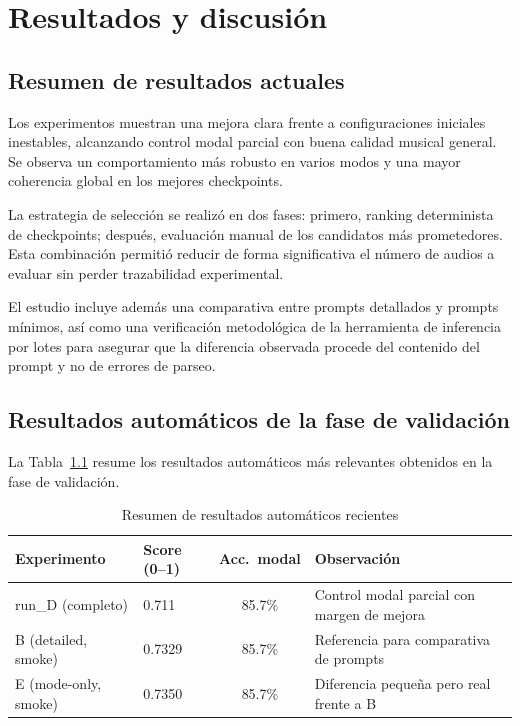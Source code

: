 \documentclass[%
    school=etsisi,%
    type=pfg,%
    degree=61CD,%
]{upm-report}
\begin{document}
\chapter{Resultados y discusi\'on}
\label{ch:resultados}

\section{Resumen de resultados actuales}

Los experimentos muestran una mejora clara frente a configuraciones iniciales inestables, alcanzando control modal parcial con buena calidad musical general. Se observa un comportamiento m\'as robusto en varios modos y una mayor coherencia global en los mejores checkpoints.

La estrategia de selecci\'on se realiz\'o en dos fases: primero, ranking determinista de checkpoints; despu\'es, evaluaci\'on manual de los candidatos m\'as prometedores. Esta combinaci\'on permiti\'o reducir de forma significativa el n\'umero de audios a evaluar sin perder trazabilidad experimental.

El estudio incluye adem\'as una comparativa entre prompts detallados y prompts m\'inimos, as\'i como una verificaci\'on metodol\'ogica de la herramienta de inferencia por lotes para asegurar que la diferencia observada procede del contenido del prompt y no de errores de parseo.

\section{Resultados autom\'aticos de la fase de validaci\'on}

La Tabla~\ref{tab:resultados-recientes} resume los resultados autom\'aticos m\'as relevantes obtenidos en la fase de validaci\'on.

\begin{table}[H]
    \centering
    \caption{Resumen de resultados autom\'aticos recientes}
    \label{tab:resultados-recientes}
    \begin{tabular}{llcp{4cm}}
        \toprule
        \textbf{Experimento} & \textbf{Score (0--1)} & \textbf{Acc.\ modal} & \textbf{Observaci\'on} \\
        \midrule
        run\_D (completo)    & 0.711 & 85.7\% & Control modal parcial con margen de mejora \\
        B (detailed, smoke)  & 0.7329 & 85.7\% & Referencia para comparativa de prompts \\
        E (mode-only, smoke) & 0.7350 & 85.7\% & Diferencia peque\~na pero real frente a B \\
        \bottomrule
    \end{tabular}
\end{table}
\end{document}
